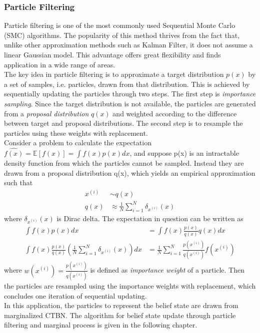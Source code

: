 \subsubsection{Particle Filtering}
Particle filtering is one of the most commonly used Sequential Monte Carlo (SMC) algorithms. The popularity of this method thrives from the fact that, unlike other approximation methods such as Kalman Filter, it does not assume a linear Gaussian model. This advantage offers great flexibility and finds application in a wide range of areas.\cite{Doucet2009} \\
The key idea in particle filtering is to approximate a target distribution $ p(x) $ by a set of samples, i.e. particles, drawn from that distribution. This is achieved by sequentially updating the particles through two steps. The first step is \textit{importance sampling}. Since the target distribution is not available, the particles are generated from a \textit{proposal distribution} $ q(x) $ and weighted according to the difference between target and proposal distributions. The second step is to resample the particles using these weights with replacement.\cite{Godsill2019} \\
Consider a problem to calculate the expectation $ \hat{f(x)} = \mathbb{E} \left[ f(x)\right] = \int f(x) p(x)dx $, and suppose p(x) is an intractable density function from which the particles cannot be sampled. Instead they are drawn from a proposal distribution q(x), which yields an empirical approximation such that
\begin{align*}
	x^{(i)} & \sim q(x) \\
	q(x) & \approx \frac{1}{N} \sum_{i=1}^{N} \delta_{x^{(i)}}(x)
\end{align*}
where $ \delta_{x^{(i)}}(x) $ is Dirac delta. The expectation in question can be written as
\begin{align*}
\int f(x) p(x)dx & = \int f(x) \frac{p(x)}{q(x)} q(x)dx\\
\int f(x) \frac{p(x)}{q(x)} \left( \frac{1}{N} \sum_{i=1}^{N} \delta_{x^{(i)}}(x)\right) dx & = \frac{1}{N} \sum_{i=1}^{N}\frac{p(x^{(i)})}{q(x^{(i)})} f(x^{(i)})
\end{align*}
where $ w(x^{(i)}) = \frac{p(x^{(i)})}{q(x^{(i)})} $ is defined as \textit{importance weight} of a particle. Then the particles are resampled using the importance weights with replacement, which concludes one iteration of sequential updating.\cite{Godsill2019}\\
In this application, the particles to represent the belief state are drawn from marginalized CTBN. The algorithm for belief state update through particle filtering and marginal process is given in the following chapter.

